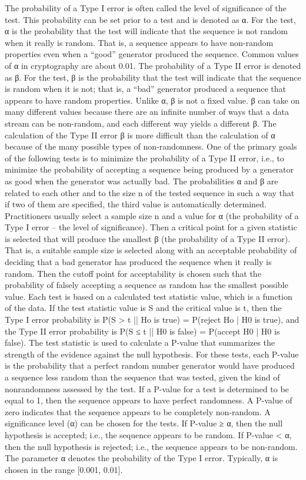 The probability of a Type I error is often called the level of significance of the test. This probability can be set prior to a test and is denoted as α. For the test, α is the probability that the test will indicate that the sequence is not random when it really is random. That is, a sequence appears to have non-random properties even when a “good” generator produced the sequence. Common values of α in cryptography are about 0.01. The probability of a Type II error is denoted as β. For the test, β is the probability that the test will indicate that the sequence is random when it is not; that is, a “bad” generator produced a sequence that appears to have random properties. Unlike α, β is not a fixed value. β can take on many different values because there are an infinite number of ways that a data stream can be non-random, and each different way yields a different β. The calculation of the Type II error β is more difficult than the calculation of α because of the many possible types of non-randomness. One of the primary goals of the following tests is to minimize the probability of a Type II error, i.e., to minimize the probability of accepting a sequence being produced by a generator as good when the generator was actually bad. The probabilities α and β are related to each other and to the size n of the tested sequence in such a way that if two of them are specified, the third value is automatically determined. Practitioners usually select a sample size n and a value for α (the probability of a Type I error – the level of significance). Then a critical point for a given statistic is selected that will produce the smallest β (the probability of a Type II error). That is, a suitable sample size is selected along with an acceptable probability of deciding that a bad generator has produced the sequence when it really is random. Then the cutoff point for acceptability is chosen such that the probability of falsely accepting a sequence as random has the smallest possible value. Each test is based on a calculated test statistic value, which is a function of the data. If the test statistic value is S and the critical value is t, then the Type I error probability is P(S > t || Ho is true) = P(reject Ho | H0 is true), and the Type II error probability is P(S ≤ t || H0 is false) = P(accept H0 | H0 is false). The test statistic is used to calculate a P-value that summarizes the strength of the evidence against the null hypothesis. For these tests, each P-value is the probability that a perfect random number generator would have produced a sequence less random than the sequence that was tested, given the kind of nonrandomness assessed by the test. If a P-value for a test is determined to be equal to 1, then the sequence appears to have perfect randomness. A P-value of zero indicates that the sequence appears to be completely non-random. A significance level (α) can be chosen for the tests. If P-value ≥ α, then the null hypothesis is accepted; i.e., the sequence appears to be random. If P-value < α, then the null hypothesis is rejected; i.e., the sequence appears to be non-random. The parameter α denotes the probability of the Type I error. Typically, α is chosen in the range [0.001, 0.01]. 

